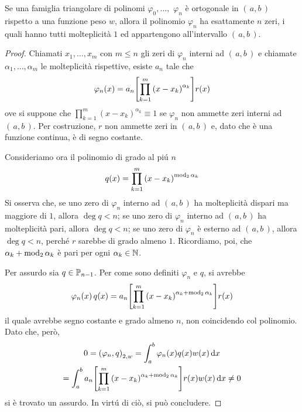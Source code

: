 	\begin{teorema}[Christoffel]
		Se una famiglia triangolare di polinomi \(\varphi_0, \dots,\) \(\varphi_n\) è ortogonale in \((\, a, b \,)\) rispetto a una funzione peso \(w\), allora il polinomio \(\varphi_n\) ha esattamente \(n\) zeri, i quali hanno tutti molteplicità \(1\) ed appartengono all'intervallo \((\, a, b \,)\).
	\end{teorema}

	\begin{proof}
		Chiamati \(x_1, \dots, x_m\) con \(m \le n\) gli zeri di \(\varphi_n\) interni ad \((\, a, b \,)\) e chiamate \(\alpha_1, \dots, \alpha_m\) le molteplicità rispettive, esiste \(a_n\) tale che
		\begin{equation*}
			\varphi_n (x) = a_n \qty[\prod_{k = 1}^m \qty(x - x_k)^{\alpha_k}] r (x)
		\end{equation*}
		ove si suppone che \(\prod_{k = 1}^m (x - x_k)^{\alpha_k} \equiv 1\) se \(\varphi_n\) non ammette zeri interni ad \((\, a, b \,)\). Per costruzione, \(r\) non ammette zeri in \((\, a, b \,)\) e, dato che è una funzione continua, è di segno costante.
		
		Consideriamo ora il polinomio di grado al piú \(n\)
		\begin{equation*}
			q (x) = \prod_{k = 1}^m \qty(x - x_k)^{\varmod_2 \alpha_k}
		\end{equation*}
		Si osserva che, se uno zero di \(\varphi_n\) interno ad \((\, a, b \,)\) ha molteplicità dispari ma maggiore di \(1\), allora \(\deg q < n\); se uno zero di \(\varphi_n\) interno ad \((\, a, b \,)\) ha molteplicità pari, allora \(\deg q < n\); se uno zero di \(\varphi_n\) è esterno ad \((\, a, b \,)\), allora \(\deg q < n\), perché \(r\) sarebbe di grado almeno \(1\). Ricordiamo, poi, che \(\alpha_k + \varmod_2 \alpha_k\) è pari per ogni \(\alpha_k \in \N\).
		
		Per assurdo sia \(q \in \P_{n - 1}\). Per come sono definiti \(\varphi_n\) e \(q\), si avrebbe
		\begin{equation*}
			\varphi_n (x) \, q(x) = a_n \qty[\prod_{k = 1}^m \qty(x - x_k)^{\alpha_k + \varmod_2 \alpha_k}] r (x)
		\end{equation*}
		il quale avrebbe segno costante e grado almeno \(n\), non coincidendo col polinomio. Dato che, però,
		\begin{multline*}
			0 = \qty(\varphi_n, q)_{2, w} = \int_a^b \varphi_n (x) q (x) w (x) \dd{x} \\
			= \int_a^b a_n \qty[\prod_{k = 1}^m \qty(x - x_k)^{\alpha_k + \varmod_2 \alpha_k}] r (x) w (x) \dd{x} \ne 0
		\end{multline*}
		si è trovato un assurdo. In virtú di ciò, si può concludere.
	\end{proof}


